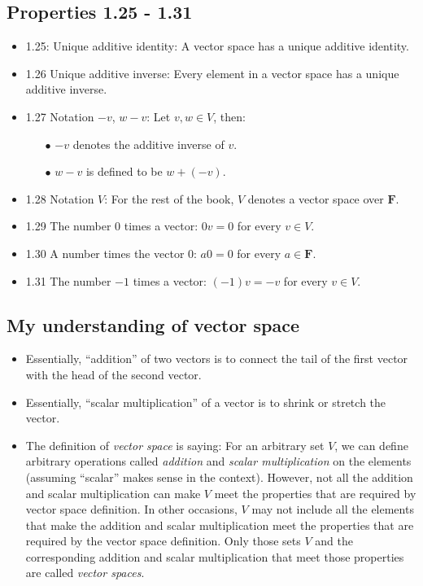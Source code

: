 \documentclass[12pt, letterpaper, oneside]{book}
\begin{document}
\subsection{Properties 1.25 - 1.31}

\begin{itemize}
  \item 1.25: Unique additive identity: A vector space has a unique additive
    identity.
  \item 1.26 Unique additive inverse: Every element in a vector space has a
    unique additive inverse.
  \item 1.27 Notation $-v$, $w - v$: Let $v, w \in V$, then:
    \begin{itemize}
      \item[$\bullet$] $-v$ denotes the additive inverse of $v$.
      \item[$\bullet$] $w - v$ is defined to be $w + (-v)$.
    \end{itemize}
  \item 1.28 Notation $V$: For the rest of the book, $V$ denotes a vector space
    over $\mathbf{F}$.
  \item 1.29 The number 0 times a vector: $0v = 0$ for every $v \in V$.
  \item 1.30 A number times the vector 0: $a0 = 0$ for every $a \in \mathbf{F}$.
  \item 1.31 The number $-1$ times a vector: $(-1)v = -v$ for every $v \in V$.
\end{itemize}

\subsection{My understanding of vector space}

\begin{itemize}
  \item Essentially, ``addition'' of two vectors is to connect the tail of the
    first vector with the head of the second vector.
  \item Essentially, ``scalar multiplication'' of a vector is to shrink or
    stretch the vector.
  \item The definition of \textit{vector space} is saying: For an arbitrary set
    $V$, we can define arbitrary operations called \textit{addition} and
    \textit{scalar multiplication} on the elements (assuming ``scalar'' makes
    sense in the context). However, not all the addition and scalar
    multiplication can make $V$ meet the properties that are required by vector
    space definition. In other occasions, $V$ may not include all the elements
    that make the addition and scalar multiplication meet the properties that
    are required by the vector space definition. Only those sets $V$ and the
    corresponding addition and scalar multiplication that meet those properties
    are called \textit{vector spaces}.
\end{itemize}
\end{document}
